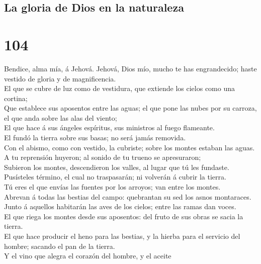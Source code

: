 \hypertarget{la-gloria-de-dios-en-la-naturaleza}{%
\subsection{La gloria de Dios en la
naturaleza}\label{la-gloria-de-dios-en-la-naturaleza}}

\hypertarget{section-103}{%
\section{104}\label{section-103}}

 Bendice, alma mía, á Jehová. Jehová, Dios mío, mucho te has
engrandecido; haste vestido de gloria y de magnificencia.\\
 El que se cubre de luz como de vestidura, que extiende los
cielos como una cortina;\\
 Que establece sus aposentos entre las aguas; el que pone
las nubes por su carroza, el que anda sobre las alas del viento;\\
 El que hace á sus ángeles espíritus, sus ministros al fuego
flameante.\\
 El fundó la tierra sobre sus basas; no será jamás
removida.\\
 Con el abismo, como con vestido, la cubriste; sobre los
montes estaban las aguas.\\
 A tu reprensión huyeron; al sonido de tu trueno se
apresuraron;\\
 Subieron los montes, descendieron los valles, al lugar que
tú les fundaste.\\
 Pusísteles término, el cual no traspasarán; ni volverán á
cubrir la tierra.\\
 Tú eres el que envías las fuentes por los arroyos; van
entre los montes.\\
 Abrevan á todas las bestias del campo: quebrantan su sed
los asnos montaraces.\\
 Junto á aquellos habitarán las aves de los cielos; entre
las ramas dan voces.\\
 El que riega los montes desde sus aposentos: del fruto de
sus obras se sacia la tierra.\\
 El que hace producir el heno para las bestias, y la hierba
para el servicio del hombre; sacando el pan de la tierra.\\
 Y el vino que alegra el corazón del hombre, y el aceite
